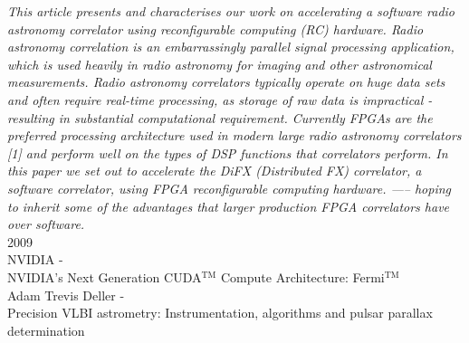 \textit{This article presents and characterises our work on
accelerating a software radio astronomy correlator
using reconfigurable computing (RC) hardware. Radio
astronomy correlation is an embarrassingly parallel signal
processing application, which is used heavily in
radio astronomy for imaging and other astronomical
measurements. Radio astronomy correlators typically
operate on huge data sets and often require real-time
processing, as storage of raw data is impractical - resulting
in substantial computational requirement. Currently
FPGAs are the preferred processing architecture used in
modern large radio astronomy correlators [1] and perform
well on the types of DSP functions that correlators
perform.
In this paper we set out to accelerate the DiFX
(Distributed FX) correlator, a software correlator, using
FPGA reconfigurable computing hardware. —– hoping
to inherit some of the advantages that larger production
FPGA correlators have over software.}\\

\noindent
{\large 2009}\\
\noindent
{\large NVIDIA - \hfill \\
NVIDIA’s Next Generation
CUDA$^{\textrm{TM}}$ Compute Architecture: Fermi$^{\textrm{TM}}$}\\
\noindent
{\large Adam Trevis Deller - \hfill \\ Precision VLBI astrometry: Instrumentation, algorithms and pulsar  parallax determination}

